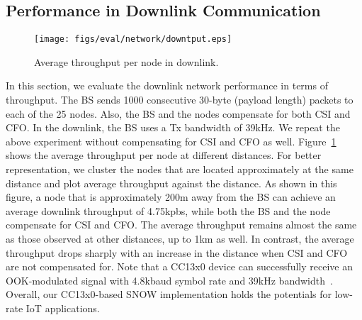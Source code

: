 
\subsection{Performance in Downlink Communication}
\begin{figure}[!htb]
\centering
\texttt{[image: figs/eval/network/downtput.eps]}
\caption{Average throughput per node in downlink.}
\label{fig:down_tput}
\end{figure}
In this section, we evaluate the downlink network performance in terms of throughput. The BS sends 1000 consecutive 30-byte (payload length) packets to each of the 25 nodes. Also, the BS and the nodes compensate for both CSI and CFO. In the downlink, the BS uses a Tx bandwidth of 39kHz. We repeat the above experiment without compensating for CSI and CFO as well. Figure~\ref{fig:down_tput} shows the average throughput per node at different distances. For better representation, we cluster the nodes that are located approximately at the same distance and plot average throughput against the distance. As shown in this figure, a node that is approximately 200m away from the BS can achieve an average downlink throughput of 4.75kpbs, while both the BS and the node compensate for CSI and CFO. The average throughput remains almost the same as those observed at other distances, up to 1km as well. In contrast, the average throughput drops sharply with an increase in the distance when CSI and CFO are not compensated for. Note that a CC13x0 device can successfully receive an OOK-modulated signal with 4.8kbaud symbol rate and 39kHz bandwidth~\cite{snow_cots}.
Overall, our CC13x0-based SNOW implementation holds the potentials for low-rate IoT applications.


